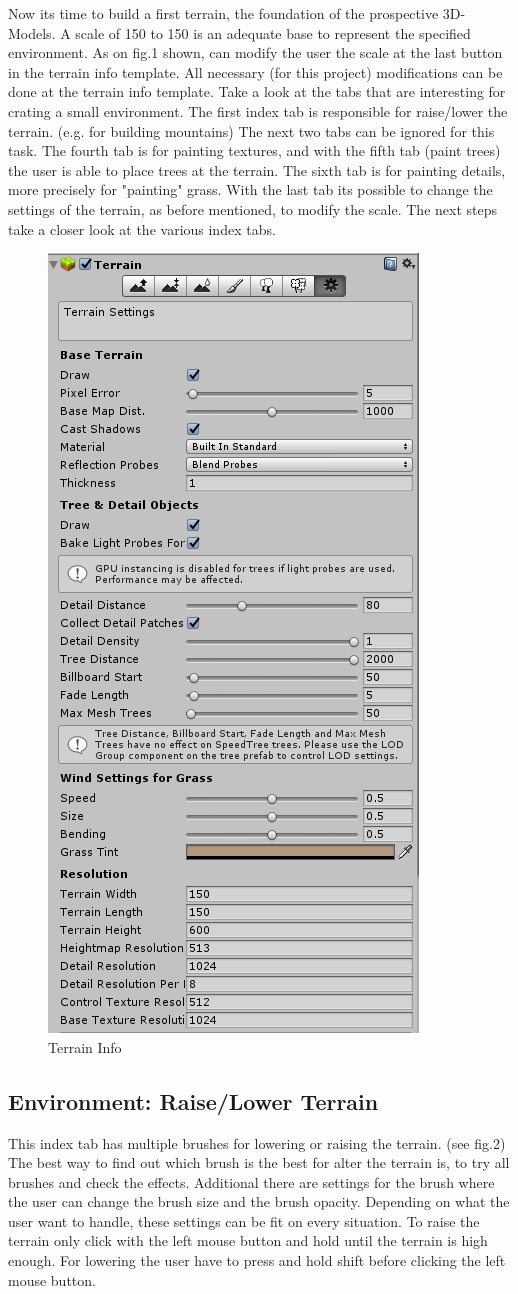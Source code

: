 \documentclass[conference]{IEEEtran}
\begin{document}
Now its time to build a first terrain, the foundation of the prospective 3D-Models. A scale of 150 to 150 is an adequate base to represent the specified environment. As on fig.1 shown, can modify the user the scale at the last button in the terrain info template. All necessary (for this project) modifications can be done at the terrain info template. Take a look at the tabs that are interesting for crating a small environment. The first index tab is responsible for raise/lower the terrain. (e.g. for building mountains) The next two tabs can be ignored for this task. The fourth tab is for painting textures, and with the fifth tab (paint trees) the user is able to place trees at the terrain. The sixth tab is for painting details, more precisely for "painting" grass. With the last tab its possible to change the settings of the terrain, as before mentioned, to modify the scale. The next steps take a closer look at the various index tabs.
\begin{figure}[htbp]
  \includegraphics[width=.4\textwidth]{pictures/terrain_info}
  \caption{Terrain Info}
  \label{fig:terrain_info}
\end{figure}

\subsection{Environment: Raise/Lower Terrain}
This index tab has multiple brushes for lowering or raising the terrain. (see fig.2) The best way to find out which brush is the
best for alter the terrain is, to try all brushes and check the effects. Additional there are settings for the brush where the user can change the brush size and the brush opacity. Depending on what the user want to handle, these settings can be fit on every situation. To raise the terrain only click with the left mouse button and hold until the terrain is high enough. For lowering the user have to press and hold shift before clicking the left mouse button.
 
\end{document}
